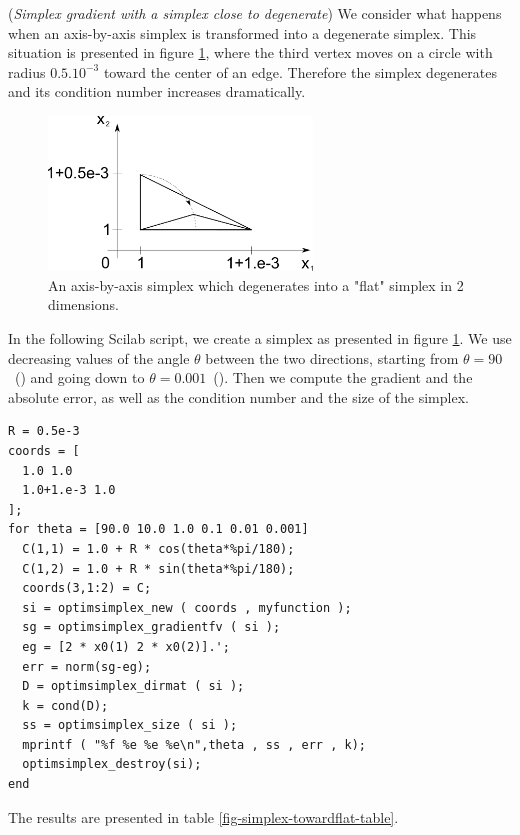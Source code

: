 \begin{example}
(\emph{Simplex gradient with a simplex close to degenerate})
We consider what happens when an axis-by-axis simplex is transformed into
a degenerate simplex. This situation is presented in figure \ref{fig-simplex-towardflat},
where the third vertex moves on a circle with radius $0.5.10^{-3}$
toward the center of an edge. Therefore the simplex degenerates
and its condition number increases dramatically.

\begin{figure}
\begin{center}
\includegraphics[width=7cm]{simplextheory/simplex_towardflat.pdf}
\end{center}
\caption{An axis-by-axis simplex which degenerates into a "flat" simplex in 2 dimensions.}
\label{fig-simplex-towardflat}
\end{figure}

In the following Scilab script, we create a simplex 
as presented in figure \ref{fig-simplex-towardflat}.
We use decreasing values of the angle $\theta$ between the 
two directions, starting from $\theta=90$~(\degre) and going 
down to $\theta=0.001$~(\degre).
Then we compute the gradient and the absolute error,
as well as the condition number and the size of the simplex.

\lstset{language=scilabscript}
\begin{lstlisting}
R = 0.5e-3
coords = [
  1.0 1.0
  1.0+1.e-3 1.0
];
for theta = [90.0 10.0 1.0 0.1 0.01 0.001]
  C(1,1) = 1.0 + R * cos(theta*%pi/180);
  C(1,2) = 1.0 + R * sin(theta*%pi/180);
  coords(3,1:2) = C;
  si = optimsimplex_new ( coords , myfunction );
  sg = optimsimplex_gradientfv ( si );
  eg = [2 * x0(1) 2 * x0(2)].';
  err = norm(sg-eg);
  D = optimsimplex_dirmat ( si );
  k = cond(D);
  ss = optimsimplex_size ( si );
  mprintf ( "%f %e %e %e\n",theta , ss , err , k);
  optimsimplex_destroy(si);
end
\end{lstlisting}

The results are presented in table \ref{fig-simplex-towardflat-table}.


\end{example}

